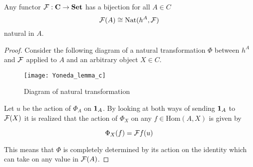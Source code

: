 \documentclass[../../main.tex]{subfiles}
\begin{document}
    \begin{theorem}
        Any functor $\functor{F}: \cat{C} \to \cat{Set}$ has a bijection for all $A \in C$ 
        $$\functor{F}(A) \cong \mathrm{Nat}(h^A, \functor{F})$$ 
        natural in $A$.
    \end{theorem}
    
    \begin{proof}
        Consider the following diagram of a natural transformation $\Phi$ between $h^A$ and $\functor{F}$ applied to $A$ and an arbitrary object $X \in C$. 
        
        \begin{figure}[H]
            \centering
            \texttt{[image: Yoneda\_lemma\_c]}
            \caption{Diagram of natural transformation}
            \label{fig:boat1}
        \end{figure}

        Let $u$ be the action of $\Phi_A$ on $\idarrow[A]$. By looking at both ways of sending $\idarrow[A]$ to $\functor{F}(X)$ it is realized that the action of $\Phi_X$ on any $f \in \mathrm{Hom}(A, X)$ is given by 

        \begin{equation}
            \Phi_X(f) = \functor{F}f(u)
        \end{equation}
        
        This means that $\Phi$ is completely determined by its action on the identity which can take on any value in $\functor{F}(A)$.
    \end{proof}
\end{document}
